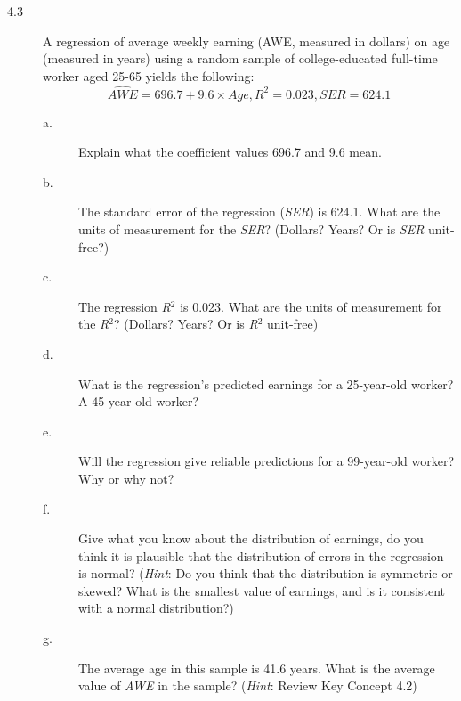 \documentclass[a4paper,11pt]{article}
\begin{document}
\begin{description}
\item[{4.3}] A regression of average weekly earning (AWE, measured in
dollars) on age (measured in years) using a random sample of
college-educated full-time worker aged 25-65 yields the
following:
\begin{equation*}
\widehat{AWE} = 696.7+ 9.6 \times Age, R^2 = 0.023, SER = 624.1
\end{equation*}
\begin{description}
\item[{a.}] Explain what the coefficient values 696.7 and 9.6 mean.
\item[{b.}] The standard error of the regression (\emph{SER}) is 624.1. What
are the units of measurement for the \emph{SER}? (Dollars? Years?
Or is \emph{SER} unit-free?)
\item[{c.}] The regression \emph{R\(^{\text{2}}\)} is 0.023. What are the units of
measurement for the \emph{R\(^{\text{2}}\)}? (Dollars? Years? Or is \emph{R\(^{\text{2}}\)} unit-free)
\item[{d.}] What is the regression's predicted earnings for a
25-year-old worker? A 45-year-old worker?
\item[{e.}] Will the regression give reliable predictions for a
99-year-old worker? Why or why not?
\item[{f.}] Give what you know about the distribution of earnings, do
you think it is plausible that the distribution of errors in
the regression is normal? (\emph{Hint}: Do you think that the
distribution is symmetric or skewed? What is the smallest
value of earnings, and is it consistent with a normal
distribution?)
\item[{g.}] The average age in this sample is 41.6 years. What is the
average value of \emph{AWE} in the sample? (\emph{Hint}: Review Key
Concept 4.2)
\end{description}
\end{description}

\vspace{0.5cm}
\end{document}
